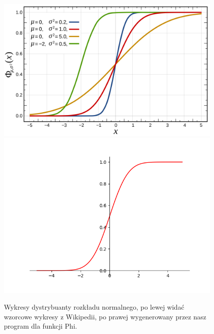 \documentclass[a4paper]{article}
\begin{document}
\begin{figure}[htbp]{}
\centerline{\includegraphics[scale=.1]{plot_Phi_wiki.png}\includegraphics[scale=.5]{plot_Phi.png}}
\caption{Wykresy dystrybuanty rozkładu normalnego, po lewej widać wzorcowe wykresy z Wikipedii, po prawej wygenerowany przez nasz program dla funkcji Phi.}
\label{fig:plot_phi}
\end{figure}
\end{document}
